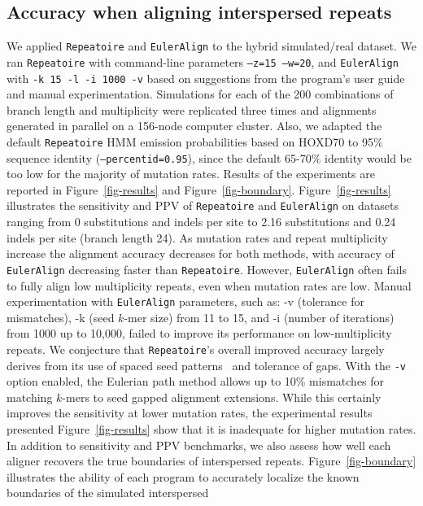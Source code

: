 \documentclass[12pt,journal,draftcls,letterpaper,onecolumn]{IEEEtran}
\begin{document}
\subsection*{Accuracy when aligning interspersed repeats}
We applied \texttt{Repeatoire} and \texttt{EulerAlign} to the
hybrid simulated/real dataset.  We ran \texttt{Repeatoire}
with command-line parameters \texttt{--z=15 --w=20}, and
\texttt{EulerAlign} with \texttt{-k 15 -l -i 1000 -v} based on suggestions
from the program's user guide and manual experimentation.
Simulations for each of the 200 combinations of branch length and
multiplicity were replicated three times and alignments generated in
parallel on a 156-node computer cluster.  Also, we adapted the default \texttt{Repeatoire} HMM emission probabilities based on HOXD70 to 95\% sequence identity (\texttt{--percentid=0.95}), since the default 65-70\% identity would be too low for the majority of mutation rates.  Results of the experiments
are reported in Figure~\ref{fig-results} and
Figure~\ref{fig-boundary}. Figure~\ref{fig-results} illustrates the
sensitivity and PPV of
\texttt{Repeatoire} and
\texttt{EulerAlign} on datasets ranging from 0 substitutions and
indels per site to 2.16 substitutions and 0.24 indels per site (branch length 24).  As
mutation rates and repeat multiplicity increase the alignment accuracy
decreases for both methods, with accuracy of \texttt{EulerAlign}
decreasing faster than \texttt{Repeatoire}.  However, \texttt{EulerAlign}
often fails to fully align low multiplicity repeats, even when mutation rates are low.
Manual experimentation with \texttt{EulerAlign} parameters, such as: -v (tolerance for mismatches), -k (seed $k$-mer size) from 11 to 15, and -i (number of iterations) from 1000 up to 10,000, failed to improve its performance on low-multiplicity repeats.
We conjecture that \texttt{Repeatoire}'s overall improved accuracy largely derives
from its use of spaced seed patterns~\cite{ref-procrast} and tolerance
of gaps. With the \texttt{-v} option enabled, the Eulerian path method allows up to 10\% mismatches for matching $k$-mers to seed gapped alignment extensions. While this certainly improves the sensitivity at lower mutation rates, the experimental results presented Figure~\ref{fig-results} show that it is inadequate for higher mutation rates. 
In addition to sensitivity and PPV benchmarks, we also assess how well
each aligner recovers the true boundaries of interspersed
repeats.  Figure~\ref{fig-boundary} illustrates the ability of each
program to accurately localize the known boundaries of the simulated interspersed
\end{document}
